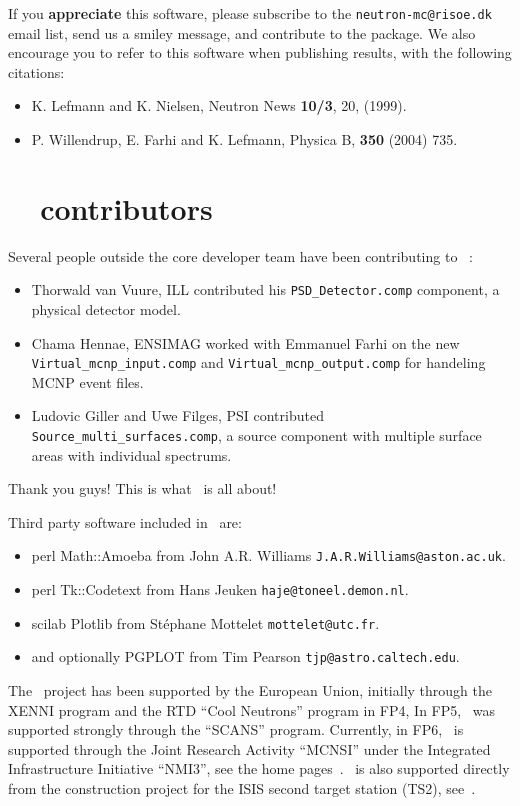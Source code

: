 If you {\bf appreciate} this software, please subscribe to the \verb+neutron-mc@risoe.dk+ email list, send us a smiley message, and contribute to the package. We also encourage you to refer to this software when publishing results, with the following citations:
\begin{itemize}
\item{K. Lefmann and K. Nielsen, Neutron News {\bf 10/3}, 20, (1999).}
\item{P. Willendrup, E. Farhi and K. Lefmann, Physica B, {\bf 350} (2004) 735.}
\end{itemize}


\section*{\MCS\ \version\ contributors}
Several people outside the core developer team have been contributing
to \MCS\ \version:
\begin{itemize}
\item Thorwald van Vuure, ILL contributed his \verb+PSD_Detector.comp+
  component, a physical detector model.
\item Chama Hennae, ENSIMAG worked with Emmanuel Farhi on the new
  \verb+Virtual_mcnp_input.comp+ and \verb+Virtual_mcnp_output.comp+
  for handeling MCNP event files.
\item Ludovic Giller and Uwe Filges, PSI contributed
  \verb+Source_multi_surfaces.comp+, a source component with multiple
  surface areas with individual spectrums.
\end{itemize}
Thank you guys! This is what \MCS\ is all about!

Third party software included in \MCS\ are:
\begin{itemize}
\item perl Math::Amoeba from John A.R. Williams \verb+J.A.R.Williams@aston.ac.uk+.
\item perl Tk::Codetext from Hans Jeuken \verb+haje@toneel.demon.nl+.
\item scilab Plotlib from St\'ephane Mottelet \verb+mottelet@utc.fr+.
\item and optionally PGPLOT from Tim Pearson \verb+tjp@astro.caltech.edu+.
\end{itemize}

The \MCS\ project has been supported by the European Union, initially
through the XENNI program and the RTD ``Cool Neutrons'' program in FP4,
In FP5, \MCS\ was supported strongly through the
``SCANS'' program.
Currently, in FP6, \MCS\ is supported through the Joint Research Activity
``MCNSI'' under the Integrated Infrastructure Initiative ``NMI3'', see
the home pages~\cite{mcnsi_webpage,nmi3_webpage}. \MCS\ is also
supported directly from the construction project for the ISIS second
target station (TS2), see~\cite{ts2_webpage}.
